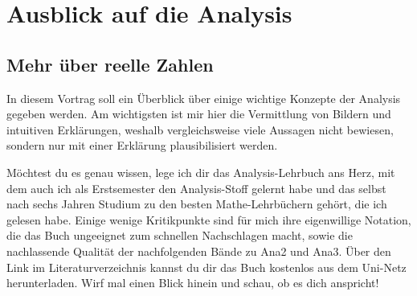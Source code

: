 



\chapter{Ausblick auf die Analysis}


\section{Mehr über reelle Zahlen}


\begin{bem}[Buchtipp]
    In diesem Vortrag soll ein Überblick über einige wichtige Konzepte der Analysis gegeben werden. Am wichtigsten ist mir hier die Vermittlung von Bildern und intuitiven Erklärungen, weshalb vergleichsweise viele Aussagen nicht bewiesen, sondern nur mit einer Erklärung plausibilisiert werden.
    
    Möchtest du es genau wissen, lege ich dir das Analysis-Lehrbuch \cite{AE06} ans Herz, mit dem auch ich als Erstsemester den Analysis-Stoff gelernt habe und das selbst nach sechs Jahren Studium zu den besten Mathe-Lehrbüchern gehört, die ich gelesen habe. Einige wenige Kritikpunkte sind für mich ihre eigenwillige Notation, die das Buch ungeeignet zum schnellen Nachschlagen macht, sowie die nachlassende Qualität der nachfolgenden Bände zu Ana2 und Ana3. Über den Link im Literaturverzeichnis kannst du dir das Buch kostenlos aus dem Uni-Netz herunterladen. Wirf mal einen Blick hinein und schau, ob es dich anspricht!
\end{bem}


